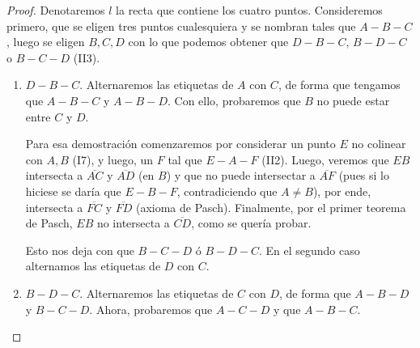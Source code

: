 \documentclass[11pt,a4paper]{book}
\begin{document}
\begin{proof}
Denotaremos $l$ la recta que contiene los cuatro puntos. Consideremos primero, que se eligen tres puntos cualesquiera y se nombran tales que $A-B-C$, luego se eligen $B,C,D$ con lo que podemos obtener que $D-B-C$, $B-D-C$ o $B-C-D$ (II3).
\begin{enumerate}
\item $D-B-C$. Alternaremos las etiquetas de $A$ con $C$, de forma que tengamos que $A-B-C$ y $A-B-D$. Con ello, probaremos que $B$ no puede estar entre $C$ y $D$.

Para esa demostración comenzaremos por considerar un punto $E$ no colinear con $A,B$ (I7), y luego, un $F$ tal que $E-A-F$ (II2). Luego, veremos que $EB$ intersecta a $\overline{AC}$ y $\overline{AD}$ (en $B$) y que no puede intersectar a $\overline{AF}$ (pues si lo hiciese se daría que $E-B-F$, contradiciendo que $A\neq B$), por ende, intersecta a $\overline{FC}$ y $\overline{FD}$ (axioma de Pasch). Finalmente, por el primer teorema de Pasch, $EB$ no intersecta a $\overline{CD}$, como se quería probar.
\begin{figure}
\centering
{}
\end{figure}

Esto nos deja con que $B-C-D$ ó $B-D-C$. En el segundo caso alternamos las etiquetas de $D$ con $C$.
\item $B-D-C$. Alternaremos las etiquetas de $C$ con $D$, de forma que $A-B-D$ y $B-C-D$. Ahora, probaremos que $A-C-D$ y que $A-B-C$.


\end{enumerate}
\end{proof}
\end{document}

